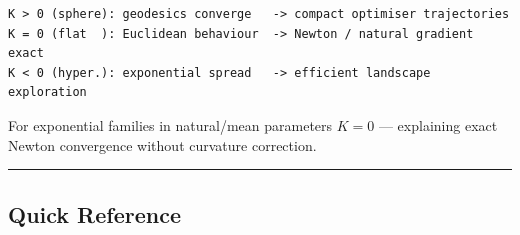 \documentclass[11pt,a4paper]{article}
\begin{document}
\begin{verbatim}
K > 0 (sphere): geodesics converge   -> compact optimiser trajectories
K = 0 (flat  ): Euclidean behaviour  -> Newton / natural gradient exact
K < 0 (hyper.): exponential spread   -> efficient landscape exploration
\end{verbatim}

For exponential families in natural/mean parameters \(K=0\) --- explaining exact Newton convergence without curvature correction.

\begin{center}\rule{0.5\linewidth}{0.5pt}\end{center}

\subsection{Quick Reference}\label{quick-reference}
\end{document}
